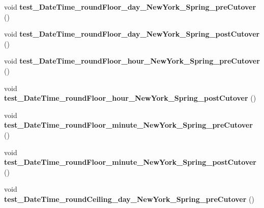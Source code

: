 \begin{DoxyCompactItemize}
\item 
\hypertarget{classorg_1_1joda_1_1time_1_1_test_date_time_zone_cutover_a8a710dadb0277c6afa46858cbe2e91fc}{void {\bfseries test\-\_\-\-Date\-Time\-\_\-round\-Floor\-\_\-day\-\_\-\-New\-York\-\_\-\-Spring\-\_\-pre\-Cutover} ()}\label{classorg_1_1joda_1_1time_1_1_test_date_time_zone_cutover_a8a710dadb0277c6afa46858cbe2e91fc}

\item 
\hypertarget{classorg_1_1joda_1_1time_1_1_test_date_time_zone_cutover_abe6759028c3c53c12559a95f4d499e56}{void {\bfseries test\-\_\-\-Date\-Time\-\_\-round\-Floor\-\_\-day\-\_\-\-New\-York\-\_\-\-Spring\-\_\-post\-Cutover} ()}\label{classorg_1_1joda_1_1time_1_1_test_date_time_zone_cutover_abe6759028c3c53c12559a95f4d499e56}

\item 
\hypertarget{classorg_1_1joda_1_1time_1_1_test_date_time_zone_cutover_a339c15b1ef30d98b235790a3c771c82c}{void {\bfseries test\-\_\-\-Date\-Time\-\_\-round\-Floor\-\_\-hour\-\_\-\-New\-York\-\_\-\-Spring\-\_\-pre\-Cutover} ()}\label{classorg_1_1joda_1_1time_1_1_test_date_time_zone_cutover_a339c15b1ef30d98b235790a3c771c82c}

\item 
\hypertarget{classorg_1_1joda_1_1time_1_1_test_date_time_zone_cutover_a0ff3699da2822f2e0845b3593f6e74ff}{void {\bfseries test\-\_\-\-Date\-Time\-\_\-round\-Floor\-\_\-hour\-\_\-\-New\-York\-\_\-\-Spring\-\_\-post\-Cutover} ()}\label{classorg_1_1joda_1_1time_1_1_test_date_time_zone_cutover_a0ff3699da2822f2e0845b3593f6e74ff}

\item 
\hypertarget{classorg_1_1joda_1_1time_1_1_test_date_time_zone_cutover_a9c6005cd26576d5026b7583eea5bbe3e}{void {\bfseries test\-\_\-\-Date\-Time\-\_\-round\-Floor\-\_\-minute\-\_\-\-New\-York\-\_\-\-Spring\-\_\-pre\-Cutover} ()}\label{classorg_1_1joda_1_1time_1_1_test_date_time_zone_cutover_a9c6005cd26576d5026b7583eea5bbe3e}

\item 
\hypertarget{classorg_1_1joda_1_1time_1_1_test_date_time_zone_cutover_a01feac1e8d6a25bfc60f28d85e182c22}{void {\bfseries test\-\_\-\-Date\-Time\-\_\-round\-Floor\-\_\-minute\-\_\-\-New\-York\-\_\-\-Spring\-\_\-post\-Cutover} ()}\label{classorg_1_1joda_1_1time_1_1_test_date_time_zone_cutover_a01feac1e8d6a25bfc60f28d85e182c22}

\item 
\hypertarget{classorg_1_1joda_1_1time_1_1_test_date_time_zone_cutover_aea153640c4d33594ba7a37dd16813082}{void {\bfseries test\-\_\-\-Date\-Time\-\_\-round\-Ceiling\-\_\-day\-\_\-\-New\-York\-\_\-\-Spring\-\_\-pre\-Cutover} ()}\label{classorg_1_1joda_1_1time_1_1_test_date_time_zone_cutover_aea153640c4d33594ba7a37dd16813082}


\end{DoxyCompactItemize}
